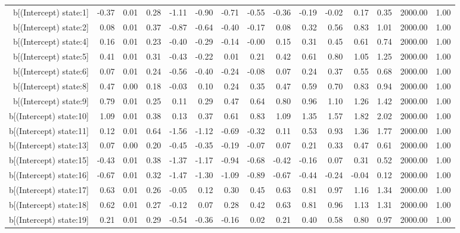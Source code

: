 \begin{table}[ht]
\begin{tabular}{rrrrrrrrrrrrrrr}
  b[(Intercept) state:1] & -0.37 & 0.01 & 0.28 & -1.11 & -0.90 & -0.71 & -0.55 & -0.36 & -0.19 & -0.02 & 0.17 & 0.35 & 2000.00 & 1.00 \\ 
  b[(Intercept) state:2] & 0.08 & 0.01 & 0.37 & -0.87 & -0.64 & -0.40 & -0.17 & 0.08 & 0.32 & 0.56 & 0.83 & 1.01 & 2000.00 & 1.00 \\ 
  b[(Intercept) state:4] & 0.16 & 0.01 & 0.23 & -0.40 & -0.29 & -0.14 & -0.00 & 0.15 & 0.31 & 0.45 & 0.61 & 0.74 & 2000.00 & 1.00 \\ 
  b[(Intercept) state:5] & 0.41 & 0.01 & 0.31 & -0.43 & -0.22 & 0.01 & 0.21 & 0.42 & 0.61 & 0.80 & 1.05 & 1.25 & 2000.00 & 1.00 \\ 
  b[(Intercept) state:6] & 0.07 & 0.01 & 0.24 & -0.56 & -0.40 & -0.24 & -0.08 & 0.07 & 0.24 & 0.37 & 0.55 & 0.68 & 2000.00 & 1.00 \\ 
  b[(Intercept) state:8] & 0.47 & 0.00 & 0.18 & -0.03 & 0.10 & 0.24 & 0.35 & 0.47 & 0.59 & 0.70 & 0.83 & 0.94 & 2000.00 & 1.00 \\ 
  b[(Intercept) state:9] & 0.79 & 0.01 & 0.25 & 0.11 & 0.29 & 0.47 & 0.64 & 0.80 & 0.96 & 1.10 & 1.26 & 1.42 & 2000.00 & 1.00 \\ 
  b[(Intercept) state:10] & 1.09 & 0.01 & 0.38 & 0.13 & 0.37 & 0.61 & 0.83 & 1.09 & 1.35 & 1.57 & 1.82 & 2.02 & 2000.00 & 1.00 \\ 
  b[(Intercept) state:11] & 0.12 & 0.01 & 0.64 & -1.56 & -1.12 & -0.69 & -0.32 & 0.11 & 0.53 & 0.93 & 1.36 & 1.77 & 2000.00 & 1.00 \\ 
  b[(Intercept) state:13] & 0.07 & 0.00 & 0.20 & -0.45 & -0.35 & -0.19 & -0.07 & 0.07 & 0.21 & 0.33 & 0.47 & 0.61 & 2000.00 & 1.00 \\ 
  b[(Intercept) state:15] & -0.43 & 0.01 & 0.38 & -1.37 & -1.17 & -0.94 & -0.68 & -0.42 & -0.16 & 0.07 & 0.31 & 0.52 & 2000.00 & 1.00 \\ 
  b[(Intercept) state:16] & -0.67 & 0.01 & 0.32 & -1.47 & -1.30 & -1.09 & -0.89 & -0.67 & -0.44 & -0.24 & -0.04 & 0.12 & 2000.00 & 1.00 \\ 
  b[(Intercept) state:17] & 0.63 & 0.01 & 0.26 & -0.05 & 0.12 & 0.30 & 0.45 & 0.63 & 0.81 & 0.97 & 1.16 & 1.34 & 2000.00 & 1.00 \\ 
  b[(Intercept) state:18] & 0.62 & 0.01 & 0.27 & -0.12 & 0.07 & 0.28 & 0.42 & 0.63 & 0.81 & 0.96 & 1.13 & 1.31 & 2000.00 & 1.00 \\ 
  b[(Intercept) state:19] & 0.21 & 0.01 & 0.29 & -0.54 & -0.36 & -0.16 & 0.02 & 0.21 & 0.40 & 0.58 & 0.80 & 0.97 & 2000.00 & 1.00 \\ 

\end{tabular}
\end{table}
